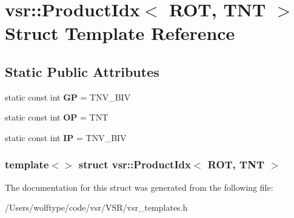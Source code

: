 \hypertarget{structvsr_1_1_product_idx_3_01_r_o_t_00_01_t_n_t_01_4}{\section{vsr\-:\-:Product\-Idx$<$ R\-O\-T, T\-N\-T $>$ Struct Template Reference}
\label{structvsr_1_1_product_idx_3_01_r_o_t_00_01_t_n_t_01_4}
}
\subsection*{Static Public Attributes}
\begin{DoxyCompactItemize}
\item 
\hypertarget{structvsr_1_1_product_idx_3_01_r_o_t_00_01_t_n_t_01_4_a11d1c0ecb50cde3ce5cd9766e6331586}{static const int {\bfseries G\-P} = T\-N\-V\-\_\-\-B\-I\-V}\label{structvsr_1_1_product_idx_3_01_r_o_t_00_01_t_n_t_01_4_a11d1c0ecb50cde3ce5cd9766e6331586}

\item 
\hypertarget{structvsr_1_1_product_idx_3_01_r_o_t_00_01_t_n_t_01_4_ac9223e2d2e4b29df397de5e4ee9f02b8}{static const int {\bfseries O\-P} = T\-N\-T}\label{structvsr_1_1_product_idx_3_01_r_o_t_00_01_t_n_t_01_4_ac9223e2d2e4b29df397de5e4ee9f02b8}

\item 
\hypertarget{structvsr_1_1_product_idx_3_01_r_o_t_00_01_t_n_t_01_4_a86a3bb19f46be04a173ad3bd91877dd2}{static const int {\bfseries I\-P} = T\-N\-V\-\_\-\-B\-I\-V}\label{structvsr_1_1_product_idx_3_01_r_o_t_00_01_t_n_t_01_4_a86a3bb19f46be04a173ad3bd91877dd2}

\end{DoxyCompactItemize}
\subsubsection*{template$<$$>$ struct vsr\-::\-Product\-Idx$<$ R\-O\-T, T\-N\-T $>$}



The documentation for this struct was generated from the following file\-:\begin{DoxyCompactItemize}
\item 
/\-Users/wolftype/code/vsr/\-V\-S\-R/vsr\-\_\-templates.\-h\end{DoxyCompactItemize}
